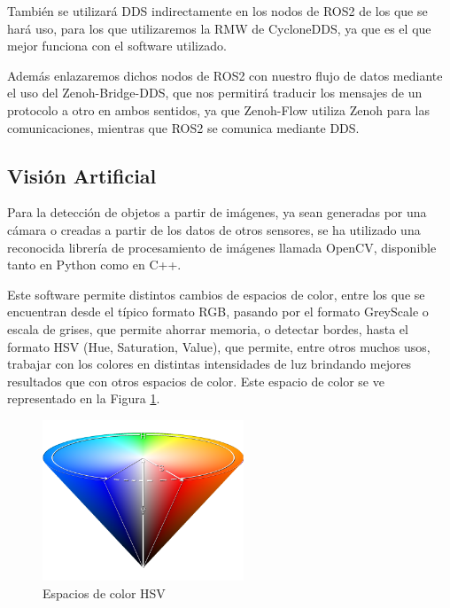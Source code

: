También se utilizará DDS indirectamente en los nodos de ROS2 de los que se hará
uso, para los que utilizaremos la RMW de CycloneDDS, ya que es el que mejor
funciona con el software utilizado.

Además enlazaremos dichos nodos de ROS2 con nuestro flujo de datos mediante el
uso del Zenoh-Bridge-DDS, que nos permitirá traducir los mensajes de un
protocolo a otro en ambos sentidos, ya que Zenoh-Flow utiliza Zenoh para las
comunicaciones, mientras que ROS2 se comunica mediante DDS.


\subsection{Visión Artificial}
\label{sec:vision_artificial}

Para la detección de objetos a partir de imágenes, ya sean generadas por una
cámara o creadas a partir de los datos de otros sensores, se ha utilizado una
reconocida librería de procesamiento de imágenes llamada OpenCV, disponible
tanto en Python como en C++.

Este software permite distintos cambios de espacios de color, entre los que se
encuentran desde el típico formato RGB, pasando por el formato GreyScale o
escala de grises, que permite ahorrar memoria, o detectar bordes, hasta el
formato HSV (Hue, Saturation, Value), que permite, entre otros muchos usos,
trabajar con los colores en distintas intensidades de luz brindando mejores
resultados que con otros espacios de color.
Este espacio de color se ve representado en la Figura \ref{fig:hsv}.

\begin{figure} [h!]
  \begin{center}
    \includegraphics[width=6cm]{figs/hsv_cone}
  \end{center}
  \caption{Espacios de color HSV \cite{hsv_cone}}
  \label{fig:hsv}
\end{figure}\

